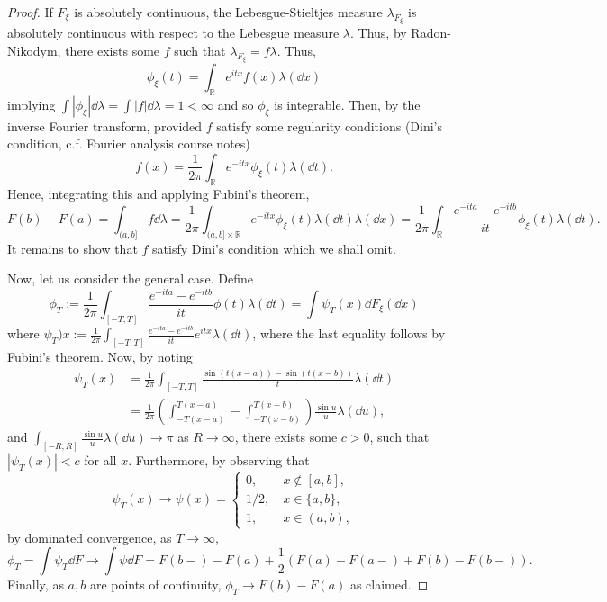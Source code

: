 \documentclass[]{article}
\theoremstyle{definition}
\theoremstyle{definition}
\begin{document}
\begin{proof}
  If \(F_\xi\) is absolutely continuous, the Lebesgue-Stieltjes measure 
  \(\lambda_{F_\xi}\) is absolutely continuous with respect to the Lebesgue measure 
  \(\lambda\). Thus, by Radon-Nikodym, there exists some \(f\) such that 
  \(\lambda_{F_\xi} = f\lambda\). Thus, 
  \[\phi_\xi(t) = \int_{\mathbb{R}}e^{itx} f(x)\lambda(\dd x)\]
  implying \(\int|\phi_\xi| \dd \lambda = \int |f| \dd \lambda = 1 < \infty\) and 
  so \(\phi_\xi\) is integrable. Then, by the inverse Fourier transform, 
  provided \(f\) satisfy some regularity conditions (Dini's condition, c.f. 
  Fourier analysis course notes)
  \[f(x) = \frac{1}{2\pi} \int_{\mathbb{R}} e^{-itx}\phi_\xi(t) \lambda(\dd t).\]
  Hence, integrating this and applying Fubini's theorem, 
  \[F(b) - F(a) = \int_{(a, b]} f \dd \lambda = 
    \frac{1}{2\pi}\int_{(a, b] \times \mathbb{R}} 
      e^{-itx}\phi_\xi(t) \lambda(\dd t) \lambda(\dd x)
    = \frac{1}{2\pi}\int_{\mathbb{R}} \frac{e^{-ita} - e^{-itb}}{it} \phi_\xi(t) \lambda(\dd t).\]
  It remains to show that \(f\) satisfy Dini's condition which we shall omit.

  Now, let us consider the general case. Define 
  \[\phi_T := \frac{1}{2\pi} \int_{[-T, T]} \frac{e^{-ita} - e^{-itb}}{it}\phi(t)\lambda(\dd t)
    = \int \psi_T(x) \dd F_\xi(\dd x)\]
  where \(\psi_T)x := \frac{1}{2\pi} \int_{[-T, T]} \frac{e^{-ita} - e^{-itb}}{it} e^{itx} \lambda(\dd t)\), 
  where the last equality follows by Fubini's theorem. Now, by noting 
  \[\begin{split}
    \psi_T(x) & = \frac{1}{2\pi} \int_{[-T, T]} \frac{\sin(t(x - a)) - \sin(t(x - b))}{t} \lambda(\dd t)\\
    & = \frac{1}{2\pi}\left(\int_{-T(x - a)}^{T(x - a)} - \int_{-T(x - b)}^{T(x - b)}\right) \frac{\sin u}{u} \lambda(\dd u),
  \end{split}\]
  and \(\int_{[-R, R]} \frac{\sin u}{u} \lambda(\dd u) \to \pi\) as \(R \to \infty\), 
  there exists some \(c > 0\), such that \(|\psi_T(x)| < c\) for all \(x\). Furthermore, 
  by observing that 
  \[\psi_T(x) \to \psi(x) = 
    \begin{cases}
      0, \ & x \not\in [a, b],\\
      1 / 2, \ & x \in \{a, b\},\\
      1, \ & x \in (a, b),
    \end{cases}\]
  by dominated convergence, as \(T \to \infty\),
  \[\phi_T = \int \psi_T \dd F \to \int \psi \dd F = 
    F(b-) - F(a) + \frac{1}{2}(F(a) - F(a-) + F(b) - F(b-)).\]
  Finally, as \(a, b\) are points of continuity, \(\phi_T \to F(b) - F(a)\) as 
  claimed.


\end{proof}
\end{document}
